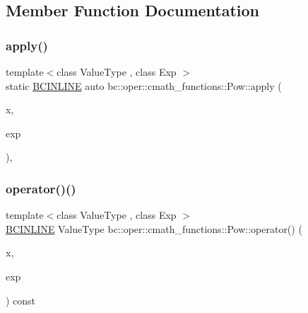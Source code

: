 \subsection{Member Function Documentation}
\mbox{\label{structbc_1_1oper_1_1cmath__functions_1_1Pow_af3407a042ba2f19d285eac300d38fad7}} 
\subsubsection{\texorpdfstring{apply()}{apply()}}
{\footnotesize\ttfamily template$<$class Value\+Type , class Exp $>$ \\
static \hyperlink{common_8h_a6699e8b0449da5c0fafb878e59c1d4b1}{B\+C\+I\+N\+L\+I\+NE} auto bc\+::oper\+::cmath\+\_\+functions\+::\+Pow\+::apply (\begin{DoxyParamCaption}\item[{const Value\+Type \&}]{x,  }\item[{\hyperlink{structbc_1_1oper_1_1cmath__functions_1_1Exp}{Exp}}]{exp }\end{DoxyParamCaption})\hspace{0.3cm}{\ttfamily [inline]}, {\ttfamily [static]}}

\mbox{\label{structbc_1_1oper_1_1cmath__functions_1_1Pow_ad44828a1e300cc2adf15397703c17150}} 
\subsubsection{\texorpdfstring{operator()()}{operator()()}\hspace{0.1cm}{\footnotesize\ttfamily [1/2]}}
{\footnotesize\ttfamily template$<$class Value\+Type , class Exp $>$ \\
\hyperlink{common_8h_a6699e8b0449da5c0fafb878e59c1d4b1}{B\+C\+I\+N\+L\+I\+NE} Value\+Type bc\+::oper\+::cmath\+\_\+functions\+::\+Pow\+::operator() (\begin{DoxyParamCaption}\item[{const Value\+Type \&}]{x,  }\item[{\hyperlink{structbc_1_1oper_1_1cmath__functions_1_1Exp}{Exp}}]{exp }\end{DoxyParamCaption}) const\hspace{0.3cm}{\ttfamily [inline]}}

